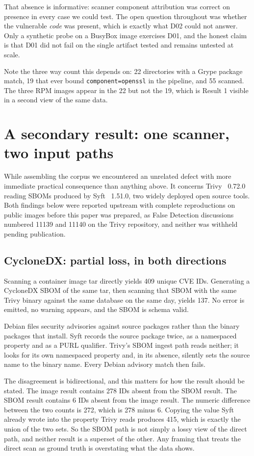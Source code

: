 That absence is informative: scanner component attribution was correct on
presence in every case we could test. The open question throughout was whether
the vulnerable \emph{code} was present, which is exactly what D02 could not
answer. Only a synthetic probe on a BusyBox image exercises D01, and the honest
claim is that D01 did not fail on the single artifact tested and remains untested
at scale.

Note the three way count this depends on: 22 directories with a Grype package
match, 19 that ever bound \texttt{component=openssl} in the pipeline, and 55
scanned. The three RPM images appear in the 22 but not the 19, which is Result 1
visible in a second view of the same data.

\section{A secondary result: one scanner, two input paths}
\label{sec:interop}

While assembling the corpus we encountered an unrelated defect with more
immediate practical consequence than anything above. It concerns Trivy~\cite{trivy} 0.72.0
reading SBOMs produced by Syft~\cite{syft} 1.51.0, two widely deployed open source tools.
Both findings below were reported upstream with complete reproductions on public
images before this paper was prepared, as False Detection discussions numbered
11139 and 11140 on the Trivy repository, and neither was withheld pending
publication.

\subsection{CycloneDX: partial loss, in both directions}

Scanning a container image tar directly yields 409 unique CVE IDs. Generating a
CycloneDX SBOM of the same tar, then scanning that SBOM with the same Trivy
binary against the same database on the same day, yields 137. No error is
emitted, no warning appears, and the SBOM is schema valid.

Debian files security advisories against source packages rather than the binary
packages that install. Syft records the source package twice, as a
namespaced property and as a PURL qualifier. Trivy's SBOM ingest path reads
neither; it looks for its own namespaced property and, in its absence, silently
sets the source name to the binary name. Every Debian advisory match then fails.

The disagreement is bidirectional, and this matters for how the result should be
stated. The image result contains 278 IDs absent from the SBOM result. The SBOM
result contains 6 IDs absent from the image result. The numeric difference
between the two counts is 272, which is 278 minus 6. Copying the value Syft
already wrote into the property Trivy reads produces 415, which
is exactly the union of the two sets. So the SBOM path is not simply a lossy view
of the direct path, and neither result is a superset of the other. Any framing
that treats the direct scan as ground truth is overstating what the data shows.

